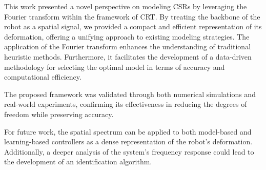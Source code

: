 This work presented a novel perspective on modeling \acp{CSR} by leveraging the Fourier transform within the framework of \ac{CRT}. By treating the backbone of the robot as a spatial signal, we provided a compact and efficient representation of its deformation, offering a unifying approach to existing modeling strategies. The application of the Fourier transform enhances the understanding of traditional heuristic methods. Furthermore, it facilitates the development of a data-driven methodology for selecting the optimal model in terms of accuracy and computational efficiency.

The proposed framework was validated through both numerical simulations and real-world experiments, confirming its effectiveness in reducing the degrees of freedom while preserving accuracy.

For future work, the spatial spectrum can be applied to both model-based and learning-based controllers as a dense representation of the robot's deformation. Additionally, a deeper analysis of the system's frequency response could lead to the development of an identification algorithm.
